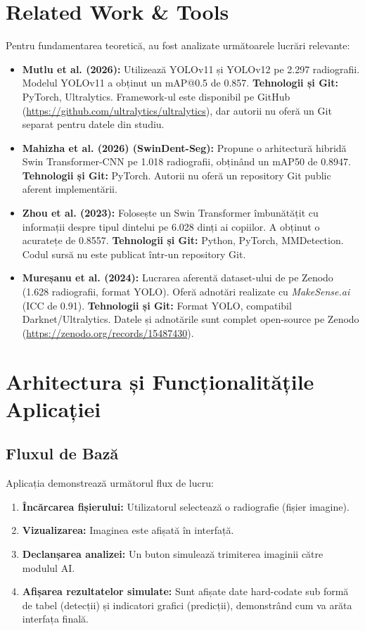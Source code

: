 \documentclass[12pt,a4paper]{article}
\begin{document}
\section{Related Work \& Tools}
Pentru fundamentarea teoretică, au fost analizate următoarele lucrări relevante:
\begin{itemize}
    \item \textbf{Mutlu et al. (2026):} Utilizează YOLOv11 și YOLOv12 pe 2.297 radiografii. Modelul YOLOv11 a obținut un mAP@0.5 de 0.857. \textbf{Tehnologii și Git:} PyTorch, Ultralytics. Framework-ul este disponibil pe GitHub (\url{https://github.com/ultralytics/ultralytics}), dar autorii nu oferă un Git separat pentru datele din studiu.
    \item \textbf{Mahizha et al. (2026) (SwinDent-Seg):} Propune o arhitectură hibridă Swin Transformer-CNN pe 1.018 radiografii, obținând un mAP50 de 0.8947. \textbf{Tehnologii și Git:} PyTorch. Autorii nu oferă un repository Git public aferent implementării.
    \item \textbf{Zhou et al. (2023):} Folosește un Swin Transformer îmbunătățit cu informații despre tipul dintelui pe 6.028 dinți ai copiilor. A obținut o acuratețe de 0.8557. \textbf{Tehnologii și Git:} Python, PyTorch, MMDetection. Codul sursă nu este publicat într-un repository Git.
    \item \textbf{Mureșanu et al. (2024):} Lucrarea aferentă dataset-ului de pe Zenodo (1.628 radiografii, format YOLO). Oferă adnotări realizate cu \textit{MakeSense.ai} (ICC de 0.91). \textbf{Tehnologii și Git:} Format YOLO, compatibil Darknet/Ultralytics. Datele și adnotările sunt complet open-source pe Zenodo (\url{https://zenodo.org/records/15487430}).
\end{itemize}

\section{Arhitectura și Funcționalitățile Aplicației}

\subsection{Fluxul de Bază}
Aplicația demonstrează următorul flux de lucru:
\begin{enumerate}
    \item \textbf{Încărcarea fișierului:} Utilizatorul selectează o radiografie (fișier imagine).
    \item \textbf{Vizualizarea:} Imaginea este afișată în interfață.
    \item \textbf{Declanșarea analizei:} Un buton simulează trimiterea imaginii către modulul AI.
    \item \textbf{Afișarea rezultatelor simulate:} Sunt afișate date hard-codate sub formă de tabel (detecții) și indicatori grafici (predicții), demonstrând cum va arăta interfața finală.
\end{enumerate}
\end{document}
